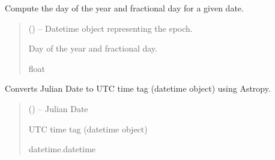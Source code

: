 \documentclass[letterpaper,10pt,english]{sphinxmanual}
\begin{document}
\begin{fulllineitems}
\label{\detokenize{fspsim.utils:fspsim.utils.Conversions.get_day_of_year_and_fractional_day}}
\pysigstartsignatures
{}
\pysigstopsignatures
\sphinxAtStartPar
Compute the day of the year and fractional day for a given date.
\begin{quote}\begin{description}
\sphinxAtStartPar
{} () – Datetime object representing the epoch.

\sphinxAtStartPar
Day of the year and fractional day.

\sphinxAtStartPar
float

\end{description}\end{quote}

\end{fulllineitems}


\begin{fulllineitems}
\label{\detokenize{fspsim.utils:fspsim.utils.Conversions.jd_to_utc}}
\pysigstartsignatures
{}
\pysigstopsignatures
\sphinxAtStartPar
Converts Julian Date to UTC time tag (datetime object) using Astropy.
\begin{quote}\begin{description}
\sphinxAtStartPar
{} () – Julian Date

\sphinxAtStartPar
UTC time tag (datetime object)

\sphinxAtStartPar
datetime.datetime

\end{description}\end{quote}

\end{fulllineitems}
\end{document}
